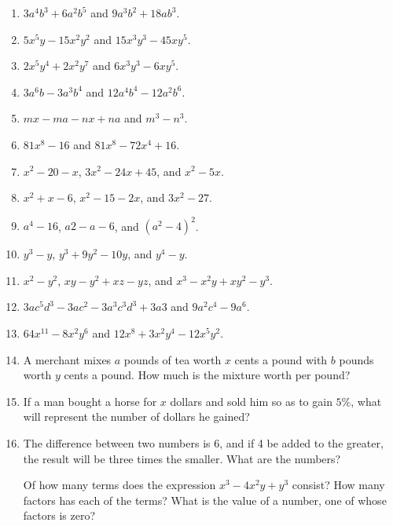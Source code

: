 \documentclass{book}
\begin{document}
\begin{enumerate}
\item $3a^4 b^3 + 6a^2 b^5$ and $9a^3 b^2 + 18 a b^3$.

\item $5 x^5 y - 15 x^2 y^2$ and $15x^3 y^3 - 45 x y^5$.

\item $2x^5 y^4 + 2x^2 y^7$ and $6 x^3 y^3 - 6x y^5$.

\item $3a^6 b - 3a^3 b^4$ and $12a^4 b^4 - 12a^2 b^6$.

\item $mx - ma - nx + na$ and $m^3 - n^3$.

\item $81 x^8 - 16$ and $81x^8-72x^4 + 16$.

\item $x^2 - 20 - x$, $3x^2 - 24 x + 45$, and $x^2 - 5x$.

\item $x^2 +x -6$, $x^2-15 - 2x$, and $3x^2-27$.

\item $a^4 - 16$, $a2 -a -6$, and $(a^2 -4)^2$.

\item $y^3 - y$, $y^3 + 9y^2 - 10y$, and $y^4-y$.

\item $x^2 - y^2$, $xy - y^2 + xz - yz$, and $x^3 - x^2 y + xy^2 -
y^3$.

\item $3a c^5 d^3 - 3a c^2 - 3a^3 c^3 d^3 + 3a3$ and $9a^2 c^4 -
9a^6$.

\item $64x^{11} - 8x^2 y^6$ and $12x^8 + 3x^2 y^4 - 12x^5 y^2$.

\item A merchant mixes $a$ pounds of tea worth $x$ cents a pound
with $b$ pounds worth $y$ cents a pound. How much is the mixture
worth per pound?

\item If a man bought a horse for $x$ dollars and sold him so as
to gain $5 \%$, what will represent the number of dollars he
gained?

\item The difference between two numbers is 6, and if 4 be added
to the greater, the result will be three times the smaller. What
are the numbers?

Of how many terms does the expression $x^{3} - 4 x^{2} y + y^{3}$
consist? How many factors has each of the terms?
What is the value of a number, one of whose factors is
zero?
\end{enumerate}
\end{document}
